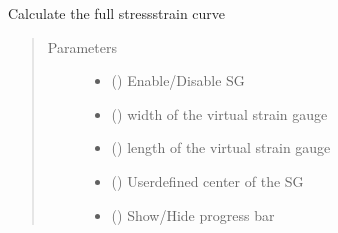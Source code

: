 \documentclass[letterpaper,10pt,english]{sphinxmanual}
\begin{document}
\begin{fulllineitems}
\begin{fulllineitems}
\label{\detokenize{openfdem:openfdem.openfdem.Model.complete_BD_stress_strain}}
Calculate the full stress\sphinxhyphen{}strain curve
\begin{quote}\begin{description}
\item[{Parameters}] \leavevmode\begin{itemize}
\item {} 
 () \textendash{} Enable/Disable SG

\item {} 
 () \textendash{} width of the virtual strain gauge

\item {} 
 () \textendash{} length of the virtual strain gauge

\item {} 
 (\sphinxstyleliteralemphasis{\sphinxupquote{{[}}}\sphinxstyleliteralemphasis{\sphinxupquote{, }}\sphinxstyleliteralemphasis{\sphinxupquote{, }}\sphinxstyleliteralemphasis{\sphinxupquote{{]}}}) \textendash{} User\sphinxhyphen{}defined center of the SG

\item {} 
 () \textendash{} Show/Hide progress bar

\end{itemize}


\end{description}
\end{quote}
\end{fulllineitems}
\end{fulllineitems}
\end{document}
